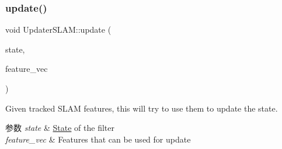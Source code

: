 \subsubsection{\texorpdfstring{update()}{update()}}
{\footnotesize\ttfamily void Updater\+S\+L\+A\+M\+::update (\begin{DoxyParamCaption}\item[{std\+::shared\+\_\+ptr$<$ \hyperlink{classov__msckf_1_1State}{State} $>$}]{state,  }\item[{std\+::vector$<$ std\+::shared\+\_\+ptr$<$ \hyperlink{classov__core_1_1Feature}{ov\+\_\+core\+::\+Feature} $>$$>$ \&}]{feature\+\_\+vec }\end{DoxyParamCaption})}



Given tracked S\+L\+AM features, this will try to use them to update the state. 


\begin{DoxyParams}{参数}
{\em state} & \hyperlink{classov__msckf_1_1State}{State} of the filter \\
\hline
{\em feature\+\_\+vec} & Features that can be used for update \\
\hline
\end{DoxyParams}
